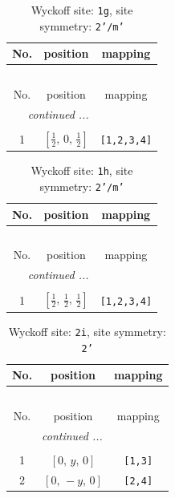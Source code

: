 \documentclass[fleqn,8pt]{jsarticle}
\begin{document}
\renewcommand{\arraystretch}{1.2}
\begin{longtable}{ccc}
\caption{Wyckoff site: {\tt 1g}, site symmetry: {\tt 2'/m'}}
 \\
 \hline \hline
No. & position & mapping \\ \hline \endfirsthead

\multicolumn{2}{l}{\tablename\ \thetable{}} \\
 \hline \hline
No. & position & mapping \\ \hline \endhead

 \hline \hline
\multicolumn{2}{r}{\footnotesize\it continued ...} \\ \endfoot

 \hline \hline
\multicolumn{2}{r}{} \\ \endlastfoot

1 & $\left[ \frac{1}{2},\, 0,\, \frac{1}{2} \right]$ & {\tt [1,2,3,4]} \\
\end{longtable}
\renewcommand{\arraystretch}{1.2}
\begin{longtable}{ccc}
\caption{Wyckoff site: {\tt 1h}, site symmetry: {\tt 2'/m'}}
 \\
 \hline \hline
No. & position & mapping \\ \hline \endfirsthead

\multicolumn{2}{l}{\tablename\ \thetable{}} \\
 \hline \hline
No. & position & mapping \\ \hline \endhead

 \hline \hline
\multicolumn{2}{r}{\footnotesize\it continued ...} \\ \endfoot

 \hline \hline
\multicolumn{2}{r}{} \\ \endlastfoot

1 & $\left[ \frac{1}{2},\, \frac{1}{2},\, \frac{1}{2} \right]$ & {\tt [1,2,3,4]} \\
\end{longtable}
\renewcommand{\arraystretch}{1.2}
\begin{longtable}{ccc}
\caption{Wyckoff site: {\tt 2i}, site symmetry: {\tt 2'}}
 \\
 \hline \hline
No. & position & mapping \\ \hline \endfirsthead

\multicolumn{2}{l}{\tablename\ \thetable{}} \\
 \hline \hline
No. & position & mapping \\ \hline \endhead

 \hline \hline
\multicolumn{2}{r}{\footnotesize\it continued ...} \\ \endfoot

 \hline \hline
\multicolumn{2}{r}{} \\ \endlastfoot

1 & $\left[ 0,\, y,\, 0 \right]$ & {\tt [1,3]} \\ \hline
2 & $\left[ 0,\, - y,\, 0 \right]$ & {\tt [2,4]} \\
\end{longtable}
\end{document}
